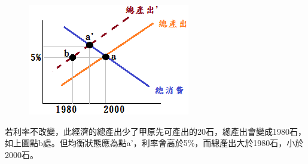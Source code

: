 \documentclass[12pt]{article}
\begin{document}
\begin{CJK}{UTF8}{cwmb}
\begin{num}
\begin{num}
\begin{figure}[htp]
\centering
\includegraphics[scale=1.00]{2.png}
\end{figure} 
		\item 若利率不改變，此經濟的總產出少了甲原先可產出的20石，總產出會變成1980石，如上圖點b處。但均衡狀態應為點a'，利率會高於5\%，而總產出大於1980石，小於2000石。
	\end{num}
\end{num}

\end{CJK}
\end{document}
